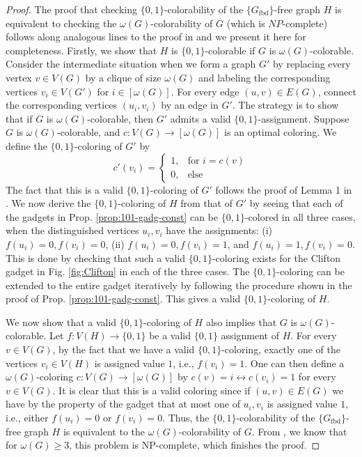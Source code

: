 \documentclass[twocolumn, a4paper, superscriptaddress,nofootinbib, accepted=2020-08-07, hyperref]{quantumarticle}
\begin{document}
\begin{proof}
	The proof that checking $\{0,1\}$-colorability of the  $\{G_{\text{fbd}}\}$-free graph $H$ is equivalent to checking the $\omega(G)$-colorability of $G$ (which is $NP$-complete) follows along analogous lines to the proof in \cite{Arends09} and we present it here for completeness. Firstly, we show that $H$ is $\{0,1\}$-colorable if $G$ is $\omega(G)$-colorable. Consider the intermediate situation when we form a graph $G'$ by replacing every vertex $v \in V(G)$ by a clique of size $\omega(G)$ and labeling the corresponding vertices $v_i \in V(G')$ for $i \in [\omega(G)]$. For every edge $(u,v) \in E(G)$, connect the corresponding vertices $(u_i,v_i)$ by an edge in $G'$. The strategy is to show that if $G$ is $\omega(G)$-colorable, then $G'$ admits a valid $\{0,1\}$-assignment. Suppose $G$ is $\omega(G)$-colorable, and $c: V(G) \rightarrow [\omega(G)]$ is an optimal coloring. We define the $\{0,1\}$-coloring of $G'$ by 
	\[
	c'(v_i) = \left\{\begin{array}{lr}
	1, & \text{for } i = c(v)\\
	0, & \text{else} 
	\end{array}\right. 
	\]
	The fact that this is a valid $\{0,1\}$-coloring of $G'$ follows the proof of Lemma 1 in \cite{Arends09}. We now derive the $\{0,1\}$-coloring of $H$ from that of $G'$ by seeing that each of the gadgets in Prop. \ref{prop:101-gadg-const} can be $\{0,1\}$-colored in all three cases, when the distinguished vertices $u_i, v_i$ have the assignments: (i) $f(u_i) = 0, f(v_i) = 0$, (ii) $f(u_i) = 0, f(v_i) = 1$, and $f(u_i) = 1, f(v_i) = 0$. This is done by checking that such a valid $\{0,1\}$-coloring exists for the Clifton gadget in Fig. \ref{fig:Clifton} in each of the three cases. The $\{0,1\}$-coloring can be extended to the entire gadget iteratively by following the procedure shown in the proof of Prop. \ref{prop:101-gadg-const}. This gives a valid $\{0,1\}$-coloring of $H$. 
	
	We now show that a valid $\{0,1\}$-coloring of $H$ also implies that $G$ is $\omega(G)$-colorable. Let $f: V(H) \rightarrow \{0,1\}$ be a valid $\{0,1\}$ assignment of $H$. For every $v \in V(G)$, by the fact that we have a valid $\{0,1\}$-coloring, exactly one of the vertices $v_i  \in V(H)$ is assigned value $1$, i.e., $f(v_i) = 1$. One can then define a $\omega(G)$-coloring $c: V(G) \rightarrow [\omega(G)]$ by $c(v) = i \leftrightarrow c(v_i) = 1$ for every $v \in V(G)$. It is clear that this is a valid coloring since if $(u,v) \in E(G)$ we have by the property of the gadget that at most one of $u_i, v_i$ is assigned value $1$, i.e., either $f(u_i) = 0$ or  $f(v_i) = 0$. Thus, the $\{0,1\}$-colorability of the $\{G_{\text{fbd}}\}$-free graph $H$ is equivalent to the $\omega(G)$-colorability of $G$. From \cite{CLRS01}, we know that for $\omega(G) \geq 3$, this problem is NP-complete, which finishes the proof. 
\end{proof}
\end{document}

